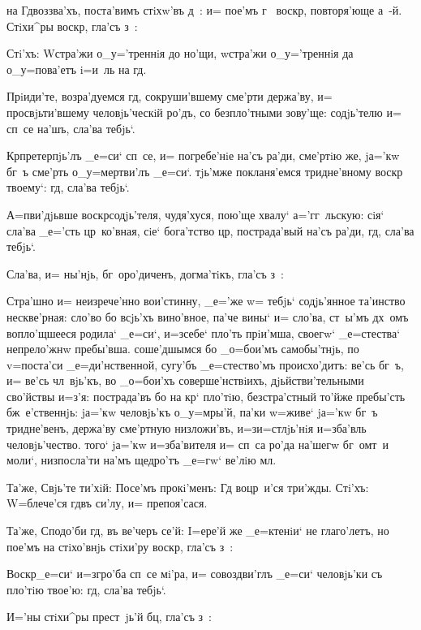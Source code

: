
на Гд воззва'хъ, поста'вимъ стiхw'въ д~: и= пое'мъ 
г~ воскр, повторя'юще а~-й. Стiхи^ры воскр, 
гла'съ з~:

Стi'хъ: W\т стра'жи о_у='треннiя до но'щи, w\т стра'жи 
о_у='треннiя да о_у=пова'етъ i=и~ль на гд.

Прiиди'те, возра'дуемся гд, сокруши'вшему сме'рти 
держа'ву, и= просвjьти'вшему человjь'ческiй ро'дъ, со 
безпло'тными зову'ще: содjь'телю и= сп~се на'шъ, сла'ва 
тебjь`.

Кр претерпjь'лъ _е=си` сп~се, и= погребе'нiе на'съ 
ра'ди, сме'ртiю же, jа='кw бг~ъ сме'рть о_у=мертви'лъ 
_е=си`. тjь'мже покланя'емся тридне'вному воскр 
твоему`: гд, сла'ва тебjь`.

А=п ви'дjьвше воскр содjь'теля, чудя'хуся, 
пою'ще хвалу` а='гг~льскую: сiя` сла'ва _е='сть 
цр~ко'вная, сiе` бога'тство цр, пострада'вый на'съ 
ра'ди, гд, сла'ва тебjь`.

Сла'ва, и= ны'нjь, бг~оро'диченъ, догма'тiкъ, гла'съ 
з~:

Стра'шно и= неизрече'нно вои'стинну, _е='же w= тебjь` 
содjь'янное та'инство нескве'рная: сло'во бо всjь'хъ 
вино'вное, па'че вины` и= сло'ва, ст~ы'мъ дх~омъ 
вопло'щшееся родила` _е=си`, и=з\ъ себе` пло'ть прiи'мша, 
своегw` _е=стества` непрело'жнw пребы'вша. соше'дшымся бо 
_о=бои'мъ самобы'тнjь, по v=поста'си _е=ди'нственной, 
сугу'бъ _е=стество'мъ происхо'дитъ: ве'сь бг~ъ, и= ве'сь 
чл~вjь'къ, во _о=бои'хъ соверше'нствiихъ, 
дjьйстви'тельными сво'йствы и=з'я: пострада'въ бо 
на кр` пло'тiю, безстра'стный то'йже пребы'сть 
бж~е'ственнjь: jа='кw человjь'къ о_у=мры'й, па'ки w=живе` 
jа='кw бг~ъ тридне'венъ, держа'ву сме'ртную низложи'въ, 
и=з\ъ и=стлjь'нiя и=зба'вль человjь'чество. того` jа='кw 
и=зба'вителя и= сп~са ро'да на'шегw бг~омт~и моли`, 
низпосла'ти на'мъ щедро'тъ _е=гw` ве'лiю мл.

Та'же, Свjь'те ти'хiй: Посе'мъ прокi'менъ: Гд 
воцр~и'ся три'жды. Стi'хъ: W=блече'ся гд въ си'лу, и= 
препоя'сася.

Та'же, Сподо'би гд, въ ве'черъ се'й: I=ере'й же 
_е=ктенiи` не глаго'летъ, но пое'мъ на стiхо'внjь 
стiхи'ру воскр, гла'съ з~:

Воскр _е=си` и=з\ъ гро'ба сп~се мi'ра, и= 
совоздви'глъ _е=си` человjь'ки съ пло'тiю твое'ю: гд, 
сла'ва тебjь`.

И='ны стiхи^ры прест~jь'й бц, гла'съ з~:

